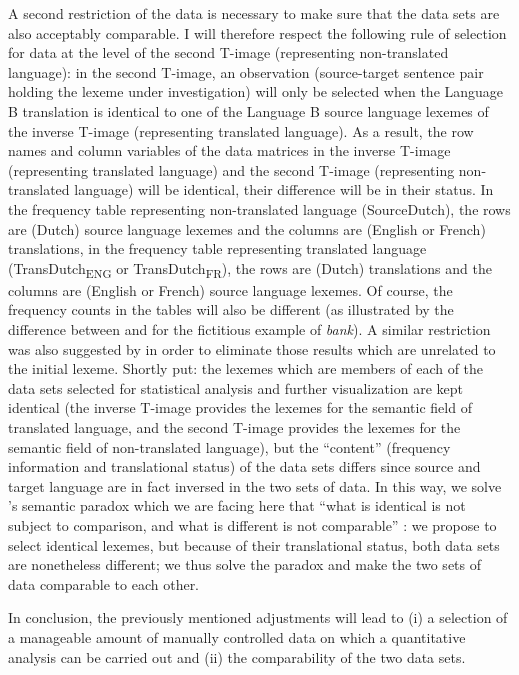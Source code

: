 A second restriction of the data is necessary to make sure that the data sets are also acceptably comparable. I will therefore respect the following rule of selection for data at the level of the second T-image (representing non-translated language): in the second T-image, an observation (source-target sentence pair holding the lexeme under investigation) will only be selected when the Language B translation is identical to one of the Language B source language lexemes of the inverse T-image (representing translated language). As a result, the row names and column variables of the data matrices in the inverse T-image (representing translated language) and the second T-image (representing non-translated language) will be identical, their difference will be in their status. In the frequency table representing non-translated language (SourceDutch), the rows are (Dutch) source language lexemes and the columns are (English or French) translations, in the frequency table representing translated language (TransDutch\textsubscript{ENG} or TransDutch\textsubscript{FR}), the rows are (Dutch) translations and the columns are (English or French) source language lexemes. Of course, the frequency counts in the tables will also be different (as illustrated by the difference between  and  for the fictitious example of \textit{bank}). A similar restriction was also suggested by \citet[60]{johansson_translational_1998} in order to eliminate those results which are unrelated to the initial lexeme. Shortly put: the lexemes which are members of each of the data sets selected for statistical analysis and further visualization are kept identical (the inverse T-image provides the lexemes for the semantic field of translated language, and the second T-image provides the lexemes for the semantic field of non-translated language), but the ``content'' (frequency information and translational status) of the data sets differs since source and target language are in fact inversed in the two sets of data. In this way, we solve \citeauthor{krzeszowski_contrasting_1990}'s semantic paradox which we are facing here that “what is identical is not subject to comparison, and what is different is not comparable” \citep[7]{krzeszowski_contrasting_1990}: we propose to select identical lexemes, but because of their translational status, both data sets are nonetheless different; we thus solve the paradox and make the two sets of data comparable to each other.

In conclusion, the previously mentioned adjustments will lead to (i) a selection of a manageable amount of manually controlled data on which a quantitative analysis can be carried out and (ii) the comparability of the two data sets.

